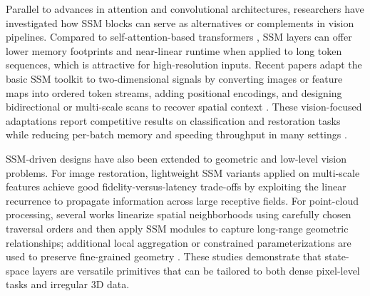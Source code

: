 Parallel to advances in attention and convolutional architectures, researchers have investigated how SSM blocks can serve as alternatives or complements in vision pipelines.  Compared to self-attention-based transformers \cite{vaswani2017attention}, SSM layers can offer lower memory footprints and near-linear runtime when applied to long token sequences, which is attractive for high-resolution inputs.  Recent papers adapt the basic SSM toolkit to two-dimensional signals by converting images or feature maps into ordered token streams, adding positional encodings, and designing bidirectional or multi-scale scans to recover spatial context \cite{zhu2024vision,liu2024vmamba,guo2024mambair}.  These vision-focused adaptations report competitive results on classification and restoration tasks while reducing per-batch memory and speeding throughput in many settings \cite{zhu2024vision,liu2024vmamba,guo2024mambair}.

SSM-driven designs have also been extended to geometric and low-level vision problems.  For image restoration, lightweight SSM variants applied on multi-scale features achieve good fidelity-versus-latency trade-offs by exploiting the linear recurrence to propagate information across large receptive fields.  For point-cloud processing, several works linearize spatial neighborhoods using carefully chosen traversal orders and then apply SSM modules to capture long-range geometric relationships; additional local aggregation or constrained parameterizations are used to preserve fine-grained geometry \cite{liang2024pointmamba,han2024mamba3d,zha2024lcm}.  These studies demonstrate that state-space layers are versatile primitives that can be tailored to both dense pixel-level tasks and irregular 3D data.


